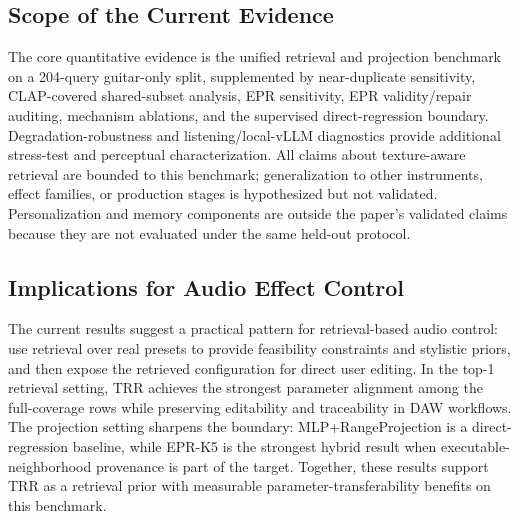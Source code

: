 \subsection{Scope of the Current Evidence}
\label{ssec:memory_exp}

The core quantitative evidence is the unified retrieval and projection benchmark on a 204-query guitar-only split, supplemented by near-duplicate sensitivity, CLAP-covered shared-subset analysis, EPR sensitivity, EPR validity/repair auditing, mechanism ablations, and the supervised direct-regression boundary. Degradation-robustness and listening/local-vLLM diagnostics provide additional stress-test and perceptual characterization. All claims about texture-aware retrieval are bounded to this benchmark; generalization to other instruments, effect families, or production stages is hypothesized but not validated. Personalization and memory components are outside the paper's validated claims because they are not evaluated under the same held-out protocol.

\subsection{Implications for Audio Effect Control}

The current results suggest a practical pattern for retrieval-based audio control: use retrieval over real presets to provide feasibility constraints and stylistic priors, and then expose the retrieved configuration for direct user editing. In the top-1 retrieval setting, TRR achieves the strongest parameter alignment among the full-coverage rows while preserving editability and traceability in DAW workflows. The projection setting sharpens the boundary: MLP+RangeProjection is a direct-regression baseline, while EPR-K5 is the strongest hybrid result when executable-neighborhood provenance is part of the target. Together, these results support TRR as a retrieval prior with measurable parameter-transferability benefits on this benchmark.

